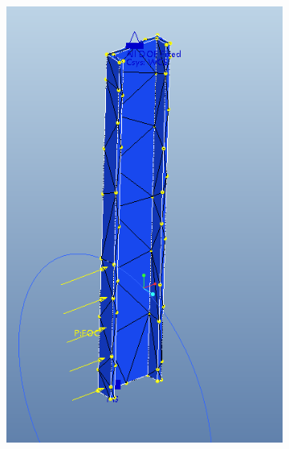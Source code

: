 \documentclass[12pt,letterpaper]{report}
\begin{document}
\begin{figure}[H]
\begin{subfigure}{.3\textwidth}
				\includegraphics[width=\textwidth]{L1MeshCrop}
				\label{fig:L1Mesh}
			\end{subfigure}
			\begin{subfigure}{.3\textwidth}

\end{subfigure}
\end{figure}
\end{document}
